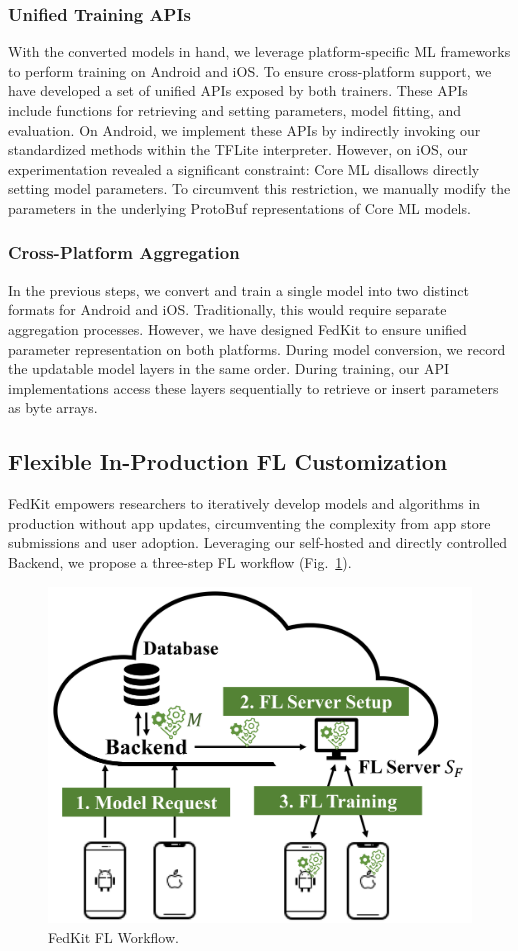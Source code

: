 \documentclass[letterpaper]{article} %
\begin{document}
\subsubsection{Unified Training APIs}
With the converted models in hand,
we leverage platform-specific ML frameworks to
perform training on Android and iOS.
To ensure cross-platform support,
we have developed a set of unified APIs exposed by both trainers.
These APIs include functions for retrieving and setting parameters,
model fitting, and evaluation.
On Android, we implement these APIs by indirectly invoking
our standardized methods within the TFLite interpreter.
However, on iOS, our experimentation revealed a significant constraint:
Core ML disallows directly setting model parameters.
To circumvent this restriction,
we manually modify the parameters in the underlying ProtoBuf representations of
Core ML models.

\subsubsection{Cross-Platform Aggregation}
In the previous steps,
we convert and train a single model into two distinct formats for
Android and iOS.
Traditionally, this would require separate aggregation processes.
However, we have designed FedKit to ensure unified parameter representation
on both platforms.
During model conversion,
we record the updatable model layers in the same order.
During training,
our API implementations access these layers sequentially to
retrieve or insert parameters as byte arrays.

\subsection{Flexible In-Production FL Customization}
\newcommand{\model}{$M$}
\newcommand{\fs}{$S_\mathrm F$}
FedKit empowers researchers to iteratively develop models and algorithms
in production without app updates,
circumventing the complexity from app store submissions and user adoption.
Leveraging our self-hosted and directly controlled Backend,
we propose a three-step FL workflow
(Fig.~\ref{fig:fl-workflow}).
\begin{figure}
    \centering
    \includegraphics*[width=0.8\linewidth]{fl_workflow.pdf}
    \caption{FedKit FL Workflow.}
    \label{fig:fl-workflow}
\end{figure}
\end{document}

